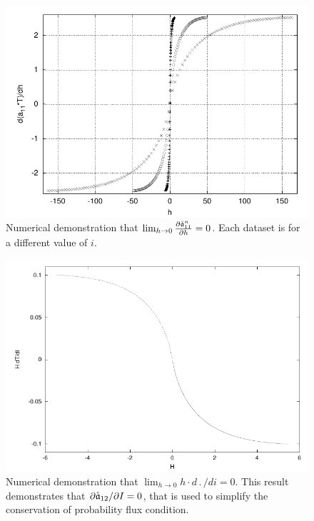 \begin{figure}
\begin{center}
\includegraphics[width=\textwidth*7/8,angle=0]{figures/lim_a11}
\caption{Numerical demonstration that $\lim_{h \to 0} \frac{\partial\mathring{\mathfrak a}_{11}^n}{\partial h} = 0$. Each dataset is for a different value of $i$.}
\label{F:lim a11}
\end{center}
\end{figure}

\begin{figure}
\begin{center}
\includegraphics[width=\textwidth*7/8]{figures/cpfbc_numerical_demo}
\caption{Numerical demonstration that $\lim_{h \to 0} h \cdot d\period/di = 0$. This result demonstrates that $\partial \mathring{\mathfrak a}_{12}/\partial I = 0$, that is used to simplify the conservation of probability flux condition.}
\label{F:lim a12}
\end{center}
\end{figure}

\begin{figure}
\begin{center}
\label{F:lim a122}
\end{center}
\end{figure}

